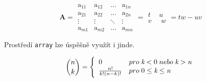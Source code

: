 \documentclass[a4paper,11pt]{article}
\theoremstyle{definition}
\theoremstyle{plain}
\begin{document}
{  \begin{equation}
    \textbf{A}=\begin{array}{|cccc|}\mathop{a}_{11}&\mathop{a}_{12}&\dots&\mathop{a}_{1n}\\
    \mathop{a}_{21}&\mathop{a}_{22}&\dots&\mathop{a}_{2n}\\
    \vdots&\vdots&\ddots&\vdots\\
    \mathop{a}_{m1}&\mathop{a}_{m2}&\dots&\mathop{a}_{mn}\end{array}
    =\begin{array}{cc}t&u\\v\;&\;w\end{array}=tw-uv\nonumber
  \end{equation}

  Prostředí \verb"array" lze úspěšně využít i jinde.

  \begin{equation}
    \binom{n}{k}=\Bigg\{\begin{array}{ll}0&pro\;\emph{k}<0\;nebo\; \emph{k}>\emph{n}\\
    \frac{n!}{k!(n-k)!}&pro\;0\leq \emph{k} \leq \emph{n}\end{array}\nonumber
  \end{equation}
}
\end{document}
